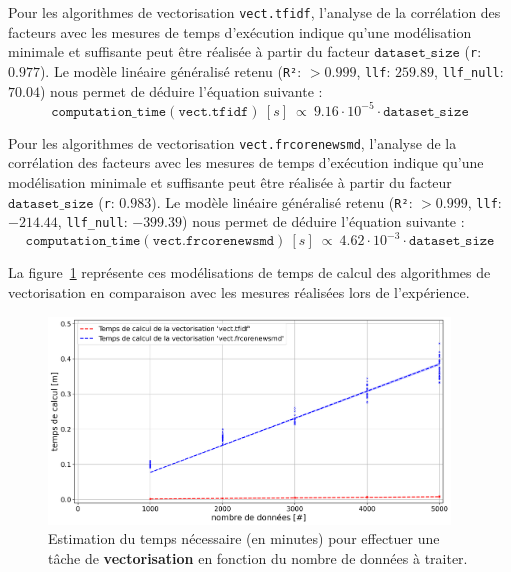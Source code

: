 			Pour les algorithmes de vectorisation \texttt{vect.tfidf}, l'analyse de la corrélation des facteurs avec les mesures de temps d'exécution indique qu'une modélisation minimale et suffisante peut être réalisée à partir du facteur $\texttt{dataset\_size}$ (\texttt{r}: $0.977$).
			Le modèle linéaire généralisé retenu (\texttt{R²}: $> 0.999$, \texttt{llf}: $259.89$, \texttt{llf\_null}: $70.04$) nous permet de déduire l'équation suivante :
			\begin{equation}
				\texttt{computation\_time}(\texttt{vect.tfidf})~[s]~
				\propto~9.16 \cdot 10^{-5} \cdot \texttt{dataset\_size}
			\end{equation}
			
			Pour les algorithmes de vectorisation \texttt{vect.frcorenewsmd}, l'analyse de la corrélation des facteurs avec les mesures de temps d'exécution indique qu'une modélisation minimale et suffisante peut être réalisée à partir du facteur $\texttt{dataset\_size}$ (\texttt{r}: $0.983$).
			Le modèle linéaire généralisé retenu (\texttt{R²}: $> 0.999$, \texttt{llf}: $-214.44$, \texttt{llf\_null}: $-399.39$) nous permet de déduire l'équation suivante :
			\begin{equation}
				\texttt{computation\_time}(\texttt{vect.frcorenewsmd})~[s]~
				\propto~4.62 \cdot 10^{-3} \cdot \texttt{dataset\_size}
			\end{equation}
			
			La figure~\ref{figure:4.3.2-ETUDE-COUTS-TEMPS-CALCUL-MODELISATION-VECTORIZATION} représente ces modélisations de temps de calcul des algorithmes de vectorisation en comparaison avec les mesures réalisées lors de l'expérience.
			\newline
			\begin{figure}[!htb]
				\centering
				\includegraphics[width=0.95\textwidth]{figures/etude-temps-calcul-modelisation-2vect}
				\caption{Estimation du temps nécessaire (en minutes) pour effectuer une tâche de \textbf{vectorisation} en fonction du nombre de données à traiter.}
				\label{figure:4.3.2-ETUDE-COUTS-TEMPS-CALCUL-MODELISATION-VECTORIZATION}
			\end{figure}
			
